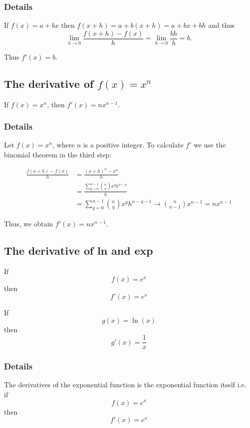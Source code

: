 \documentclass[12pt,a4paper]{article}
\theoremstyle{regla}
\theoremstyle{remark}
\theoremstyle{definition}
\theoremstyle{nonumberbreak}
\begin{document}
\subsubsection{Details}
If $f(x) = a + bx$ then $f(x + h) = a+ b(x + h) = a + bx + bh$ and thus 
$$\lim_{h \to 0} \frac{f(x+h)-f(x)}{h} = \lim_{h \to 0} \frac{bh}{h}=b.$$

Thus $f'(x)=b$.

\subsection{The derivative of  $f(x)=x^n$}
\begin{fbox}
\begin{minipage}{0.97\textwidth}
If $f(x)=x^n$, then  $f'(x)=nx^{n-1}$.
\end{minipage}
\end{fbox}
\subsubsection{Details}
Let $f(x)=x^n$, where $n$ is a positive integer. To calculate $f'$ we use the binomial theorem in the third step:

\begin{align*}
\frac{f(x+h)-f(x)}{h}&=\frac{(x+h)^n-x^n}{h}\\
&=\frac{\sum_{q=0}^{n-1}\binom{n}{q}x^qh^{n-q}}{h}\\
&=\sum_{q=0}^{n-1}\binom{n}{q}x^qh^{n-q-1}\to\binom{n}{n-1}x^{n-1}=nx^{n-1}
\end{align*}

Thus, we obtain $f'(x)=nx^{n-1}$.


\subsection{The derivative of ln and exp}
\begin{fbox}
\begin{minipage}{0.97\textwidth}
If
	$$f(x)  = e^x$$
then
	$$f'(x) = e^x$$

If	
	$$g(x) = \ln(x)$$
then
	$$g'(x) = \frac{1}{x}$$

\end{minipage}
\end{fbox}
\subsubsection{Details}
The derivatives of the  exponential function is the exponential  function itself i.e. \\ if
	$$f(x)  = e^x$$
then
	$$f'(x) = e^x$$
\end{document}
